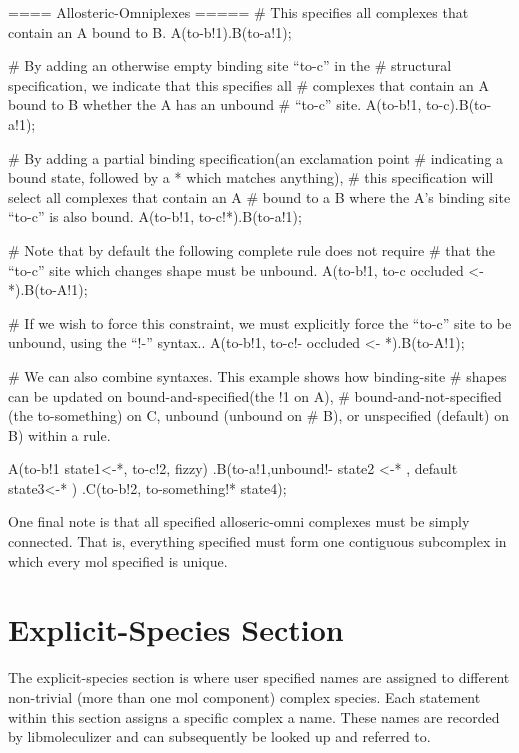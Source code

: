 \begin{ExampleMZR}
==== Allosteric-Omniplexes =====
  # This specifies all complexes that contain an A bound to B.
  A(to-b!1).B(to-a!1);

  # By adding an otherwise empty binding site ``to-c'' in the
  # structural specification, we indicate that this specifies all
  # complexes that contain an A bound to B whether the A has an unbound
  # ``to-c'' site.
  A(to-b!1, to-c).B(to-a!1);


  # By adding a partial binding specification(an exclamation point
  # indicating a bound state, followed by a * which matches anything),
  # this specification will select all complexes that contain an A
  # bound to a B where the A's binding site ``to-c'' is also bound.
  A(to-b!1, to-c!*).B(to-a!1);

  # Note that by default the following complete rule does not require
  # that the ``to-c'' site which changes shape must be unbound.  
  A(to-b!1, to-c {occluded <- *}).B(to-A!1);

  # If we wish to force this constraint, we must explicitly force the
  ``to-c'' site to be unbound, using the ``!-'' syntax..
  A(to-b!1, to-c!- {occluded <- *}).B(to-A!1);

  # We can also combine syntaxes.  This example shows how binding-site
  # shapes can be updated on bound-and-specified(the !1 on A),
  # bound-and-not-specified (the to-something) on C, unbound (unbound on
  # B), or unspecified (default) on B) within a rule.

  A(to-b!1 {state1<-*}, to-c!2, fizzy) 
  .B(to-a!1,unbound!- {state2 <-* }, default {state3<-*} ) 
  .C(to-b!2, to-something!* {state4});

\end{ExampleMZR}

One final note is that all specified alloseric-omni complexes must be
simply connected.  That is, everything specified must form one contiguous
subcomplex in which every mol specified is unique.


\section{Explicit-Species Section}
The explicit-species section is where user specified names are
assigned to different non-trivial (more than one mol component)
complex species.  Each statement within this section assigns a
specific complex a name.  These names are recorded by libmoleculizer
and can subsequently be looked up and referred to.

